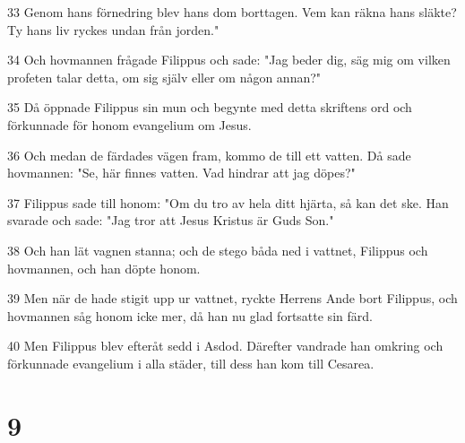 \par 33 Genom hans förnedring blev hans dom borttagen. Vem kan räkna hans släkte? Ty hans liv ryckes undan från jorden."
\par 34 Och hovmannen frågade Filippus och sade: "Jag beder dig, säg mig om vilken profeten talar detta, om sig själv eller om någon annan?"
\par 35 Då öppnade Filippus sin mun och begynte med detta skriftens ord och förkunnade för honom evangelium om Jesus.
\par 36 Och medan de färdades vägen fram, kommo de till ett vatten. Då sade hovmannen: "Se, här finnes vatten. Vad hindrar att jag döpes?"
\par 37 Filippus sade till honom: "Om du tro av hela ditt hjärta, så kan det ske. Han svarade och sade: "Jag tror att Jesus Kristus är Guds Son."
\par 38 Och han lät vagnen stanna; och de stego båda ned i vattnet, Filippus och hovmannen, och han döpte honom.
\par 39 Men när de hade stigit upp ur vattnet, ryckte Herrens Ande bort Filippus, och hovmannen såg honom icke mer, då han nu glad fortsatte sin färd.
\par 40 Men Filippus blev efteråt sedd i Asdod. Därefter vandrade han omkring och förkunnade evangelium i alla städer, till dess han kom till Cesarea.

\chapter{9}

